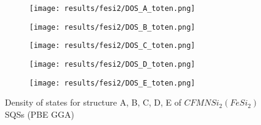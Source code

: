 \begin{figure}[H]
	\centering
	\begin{subfigure}{0.9\textwidth}
		\texttt{[image: results/fesi2/DOS\_A\_toten.png]}
	\end{subfigure}

	\begin{subfigure}{0.9\textwidth}
		\texttt{[image: results/fesi2/DOS\_B\_toten.png]}
	\end{subfigure}
	\begin{subfigure}{0.9\textwidth}
		\texttt{[image: results/fesi2/DOS\_C\_toten.png]}
	\end{subfigure}
\end{figure}
\begin{figure}[H]
	\centering
	\begin{subfigure}{0.9\textwidth}
		\texttt{[image: results/fesi2/DOS\_D\_toten.png]}
	\end{subfigure}
	\begin{subfigure}{0.9\textwidth}
		\texttt{[image: results/fesi2/DOS\_E\_toten.png]}
	\end{subfigure}
	\caption{Density of states for structure A, B, C, D, E of $CFMNSi_2 (FeSi_2)$ SQSs (PBE GGA)}
	\label{dos_fesi2_gga}
\end{figure}



